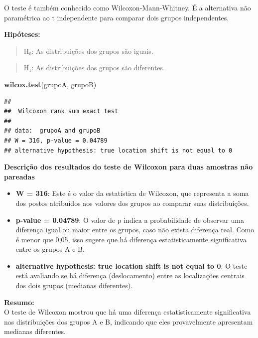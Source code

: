 \documentclass[
]{book}
\newenvironment{Shaded}{\begin{snugshade}}{\end{snugshade}}
\newcommand{\FunctionTok}[1]{\textcolor[rgb]{0.13,0.29,0.53}{\textbf{#1}}}
\newcommand{\NormalTok}[1]{#1}
\providecommand{\tightlist}{%
  \setlength{\itemsep}{0pt}\setlength{\parskip}{0pt}}
\begin{document}
O teste é também conhecido como Wilcoxon-Mann-Whitney. É a alternativa não paramétrica ao t independente para comparar dois grupos independentes.

\textbf{Hipóteses:}

\begin{quote}
H₀: As distribuições dos grupos são iguais.
\end{quote}

\begin{quote}
H₁: As distribuições dos grupos são diferentes.
\end{quote}

\begin{Shaded}
\begin{Highlighting}[]
\FunctionTok{wilcox.test}\NormalTok{(grupoA, grupoB)}
\end{Highlighting}
\end{Shaded}

\begin{verbatim}
## 
##  Wilcoxon rank sum exact test
## 
## data:  grupoA and grupoB
## W = 316, p-value = 0.04789
## alternative hypothesis: true location shift is not equal to 0
\end{verbatim}

\textbf{Descrição dos resultados do teste de Wilcoxon para duas amostras não pareadas}

\begin{itemize}
\tightlist
\item
  \textbf{W = 316}: Este é o valor da estatística de Wilcoxon, que representa a soma dos postos atribuídos aos valores dos grupos ao comparar suas distribuições.
\item
  \textbf{p-value = 0.04789}: O valor de p indica a probabilidade de observar uma diferença igual ou maior entre os grupos, caso não exista diferença real. Como é menor que 0,05, isso sugere que há diferença estatisticamente significativa entre os grupos A e B.
\item
  \textbf{alternative hypothesis: true location shift is not equal to 0}: O teste está avaliando se há diferença (deslocamento) entre as localizações centrais dos dois grupos (medianas diferentes).
\end{itemize}

\textbf{Resumo:}\\
O teste de Wilcoxon mostrou que há uma diferença estatisticamente significativa nas distribuições dos grupos A e B, indicando que eles provavelmente apresentam medianas diferentes.
\end{document}
